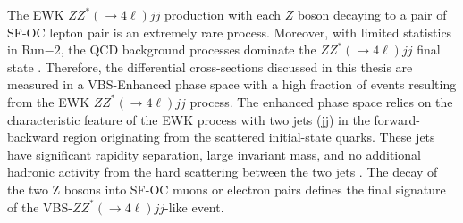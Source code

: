 The EWK $ZZ^*(\rightarrow 4\ell ) jj$ production with each $Z$ boson decaying to a pair of SF-OC lepton pair is an extremely rare process. Moreover, with limited statistics in Run$-2$, the QCD background processes dominate the $ZZ^*(\rightarrow 4\ell ) jj$ final state \cite{ATLASZZjj}. Therefore, the differential cross-sections discussed in this thesis are measured in a VBS-Enhanced phase space with a high fraction of events resulting from the EWK $ZZ^*(\rightarrow 4\ell ) jj$ process. The enhanced phase space relies on the characteristic feature of the EWK process with two jets (jj) in the forward-backward region originating from the scattered initial-state quarks. These jets have significant rapidity separation, large invariant mass, and no additional hadronic activity from the hard scattering between the two jets \cite{RapidityGapCite}. The decay of the two Z bosons into SF-OC muons or electron pairs defines the final signature of the VBS-$ZZ^*(\rightarrow 4\ell ) jj$-like event.
